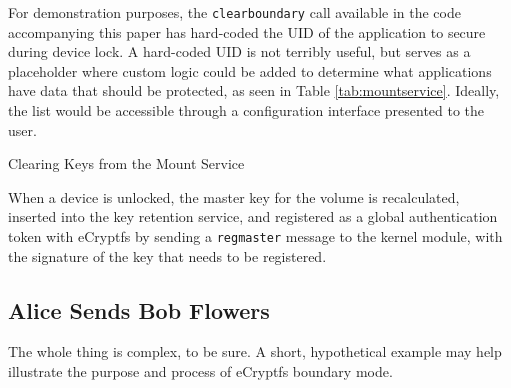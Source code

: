 For demonstration purposes, the \texttt{clearboundary} call available in the code accompanying this paper has hard-coded the UID of
the application to secure during device lock. A hard-coded UID is not terribly useful, but serves as a placeholder where custom
logic could be added to determine what applications have data that should be protected, as seen in Table \ref{tab:mountservice}.
Ideally, the list would be accessible through a configuration interface presented to the user.

\begin{table}[!htb]

\caption{Clearing Keys from the Mount Service}
\label{tab:mountservice}
\end{table}

When a device is unlocked, the master key for the volume is recalculated, inserted into the key retention service, and registered
as a global authentication token with eCryptfs by sending a \texttt{regmaster} message to the kernel module, with the signature of
the key that needs to be registered. 

\subsection{Alice Sends Bob Flowers}
\label{sec:alicebob}
The whole thing is complex, to be sure. A short, hypothetical example may help illustrate the purpose and process of eCryptfs boundary mode.  

